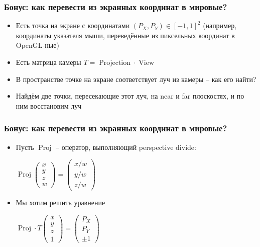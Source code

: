 \documentclass[10pt]{beamer}
\begin{document}
\begin{frame}[fragile]
\frametitle{Бонус: как перевести из экранных координат в мировые?}
\begin{itemize}
\item Есть точка на экране с координатами \begin{math}(P_X, P_Y) \in [-1, 1]^2\end{math} (например, координаты указателя мыши, переведённые из пиксельных координат в OpenGL-ные)
\pause
\item Есть матрица камеры \begin{math}T=\operatorname{Projection}\cdot\operatorname{View}\end{math}
\pause
\item В пространстве точке на экране соответствует луч из камеры -- как его найти?
\pause
\item Найдём две точки, пересекающие этот луч, на near и far плоскостях, и по ним восстановим луч
\end{itemize}
\end{frame}

\begin{frame}[fragile]
\frametitle{Бонус: как перевести из экранных координат в мировые?}
\begin{itemize}
\item Пусть \begin{math}\operatorname{Proj}\end{math} -- оператор, выполняющий perspective divide:
\begin{center}
\begin{math}
\operatorname{Proj}\begin{pmatrix}x \\ y \\ z \\ w\end{pmatrix} = \begin{pmatrix}x/w \\ y/w \\ z/w\end{pmatrix}
\end{math}
\end{center}
\pause
\item Мы хотим решить уравнение
\begin{center}
\begin{math}
\operatorname{Proj}\cdot T \begin{pmatrix}x \\ y \\ z \\ 1\end{pmatrix} = \begin{pmatrix}P_X \\ P_Y \\ \pm 1\end{pmatrix}
\end{math}
\end{center}
\end{itemize}
\end{frame}
\end{document}
